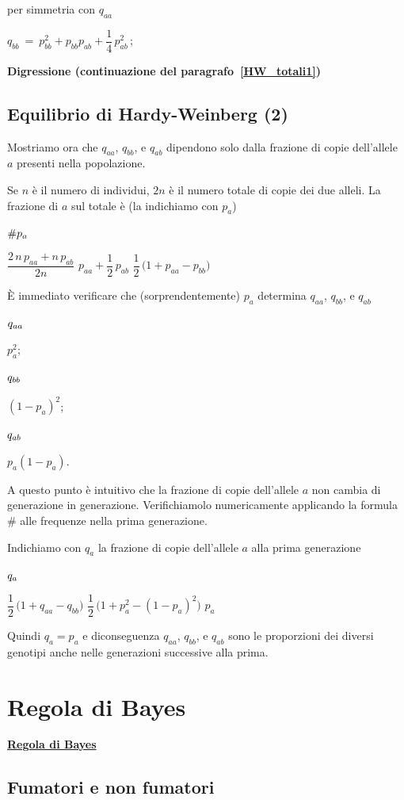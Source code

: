 \documentclass[11pt,openany]{book}
\begin{document}
per simmetria con $q_{aa}$

$q_{bb}\ =\ p_{bb}^2+p_{bb}p_{ab} +\dfrac{1}{4}\,p^2_{ab}\,$;


\clearpage\hfill\textbf{Digressione (continuazione del paragrafo~\ref{HW_totali1})}\subsection{Equilibrio di Hardy-Weinberg (2)}

\def\ceq#1#2#3{\parbox{12ex}{$\displaystyle #1$}\medrel{#2}$\displaystyle  #3$}

Mostriamo ora che $q_{aa}$, $q_{bb}$, e $q_{ab}$ dipendono solo dalla frazione di copie dell'allele $a$ presenti nella popolazione. 

Se $n$ \`e il numero di individui, $2n$ è il numero totale di copie dei due alleli. La frazione di $a$ sul totale è (la indichiamo con $p_a$)

\ceq{\#\hfill p_a}{=}{\dfrac{2\,n\,p_{aa}+n\,p_{ab}}{2n}}
\medrel{=}$p_{aa}+\dfrac12\,p_{ab}$
\medrel{=}$\dfrac12\,\big(1+p_{aa}-p_{bb}\big)$

È immediato verificare che (sorprendentemente) $p_a$ determina  $q_{aa}$, $q_{bb}$, e $q_{ab}$

\ceq{\hfill q_{aa}}{=}{p_a^2};
\ceq{\hfill q_{bb}}{=}{(1-p_a)^2};
\ceq{\hfill q_{ab}}{=}{p_a(1-p_a)}.

A questo punto è intuitivo che la frazione di copie dell'allele $a$ non cambia di generazione in generazione. Verifichiamolo numericamente applicando la formula $\#$ alle frequenze nella prima generazione.

Indichiamo con $q_a$ la frazione di copie dell'allele $a$ alla prima generazione

\ceq{\hfill q_a}{=}{\dfrac12\,\big(1+q_{aa}-q_{bb}\big)}
\medrel{=}$\dfrac12\,\big(1+p^2_{a}-(1-p_{a})^2\big)$
\medrel{=}$p_a$

Quindi $q_a=p_a$ e diconseguenza $q_{aa}$, $q_{bb}$, e $q_{ab}$ sono le proporzioni dei diversi genotipi anche nelle generazioni successive alla prima.


\clearpage\section{Regola di Bayes}
\label{Bayes}
\hfill\textbf{{\color{brown}\hyperref[RegolaBayes]{Regola di Bayes} \faShare}}
\subsection{Fumatori e non fumatori}
\label{Fumatori_Bayes}
\end{document}
